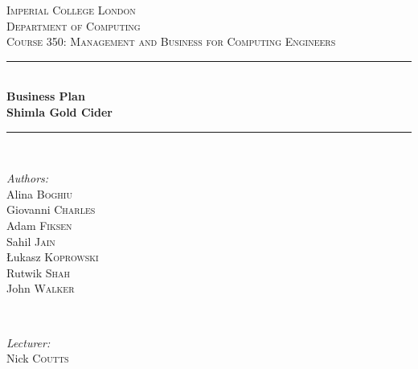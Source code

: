 \documentclass[11pt]{article}
\begin{document}

\begin{titlepage}
\newcommand{\HRule}{\rule{\linewidth}{0.5mm}}
\center
\textsc{\LARGE Imperial College London}  \\[1.5cm]
\textsc{\Large Department of Computing}  \\[0.5cm]
\textsc{\large Course 350: Management and Business for Computing Engineers}
\\[0.5cm]

\HRule \\[0.3cm]
{\huge \bfseries Business Plan \\ \vspace{0.3cm}Shimla Gold Cider} \\[0.3cm]
\HRule \\[1.5cm]
\begin{minipage}{0.4\textwidth}

\begin{flushleft} \large \emph{Authors:} \\
Alina     \textsc{Boghiu}    \\
Giovanni  \textsc{Charles}   \\
Adam      \textsc{Fiksen}    \\
Sahil     \textsc{Jain}      \\
\L ukasz  \textsc{Koprowski} \\
Rutwik    \textsc{Shah}      \\
John      \textsc{Walker}    \\
\end{flushleft}

\end{minipage}~
\begin{minipage}{0.4\textwidth}

\begin{flushright} \large \emph{Lecturer:} \\
Nick \textsc{Coutts}
\end{flushright}
\end{minipage}\\[4cm]


\end{titlepage}

\end{document}
